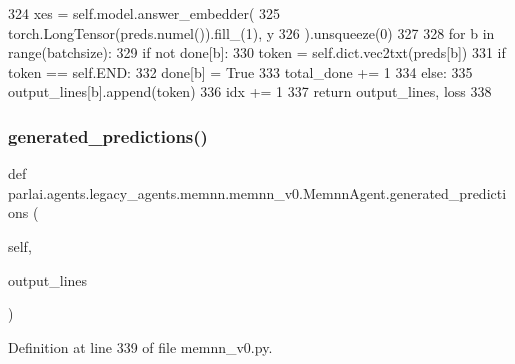 \begin{DoxyCode}
324             xes = self.model.answer\_embedder(
325                 torch.LongTensor(preds.numel()).fill\_(1), y
326             ).unsqueeze(0)
327 
328             \textcolor{keywordflow}{for} b \textcolor{keywordflow}{in} range(batchsize):
329                 \textcolor{keywordflow}{if} \textcolor{keywordflow}{not} done[b]:
330                     token = self.dict.vec2txt(preds[b])
331                     \textcolor{keywordflow}{if} token == self.END:
332                         done[b] = \textcolor{keyword}{True}
333                         total\_done += 1
334                     \textcolor{keywordflow}{else}:
335                         output\_lines[b].append(token)
336             idx += 1
337         \textcolor{keywordflow}{return} output\_lines, loss
338 
\end{DoxyCode}
\mbox{\label{classparlai_1_1agents_1_1legacy__agents_1_1memnn_1_1memnn__v0_1_1MemnnAgent_a15b8b76a2d2ae5e0a4de2978e5ac0ac5}} 
\subsubsection{\texorpdfstring{generated\+\_\+predictions()}{generated\_predictions()}}
{\footnotesize\ttfamily def parlai.\+agents.\+legacy\+\_\+agents.\+memnn.\+memnn\+\_\+v0.\+Memnn\+Agent.\+generated\+\_\+predictions (\begin{DoxyParamCaption}\item[{}]{self,  }\item[{}]{output\+\_\+lines }\end{DoxyParamCaption})}



Definition at line 339 of file memnn\+\_\+v0.\+py.


